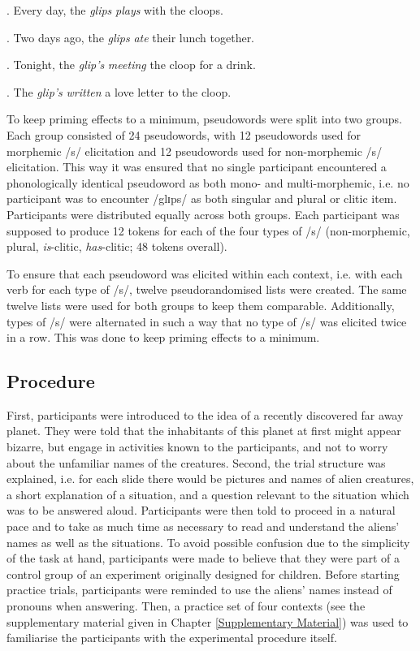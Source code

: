 \ex.
\label{ex:4.1}
Every day, the \textit{glips} \textit{plays} with the cloops.

\ex.
\label{ex:4.2}
Two days ago, the \textit{glips} \textit{ate} their lunch together.

\ex.
\label{ex:4.3}
Tonight, the \textit{glip's} \textit{meeting} the cloop for a drink.

\ex.
\label{ex:4.4}
The \textit{glip's} \textit{written} a love letter to the cloop.

To keep priming effects to a minimum, pseudowords were split into two groups. Each group consisted of 24 pseudowords, with 12 pseudowords used for morphemic /s/ elicitation and 12 pseudowords used for non-morphemic /s/ elicitation. This way it was ensured that no single participant encountered a phonologically identical pseudoword as both mono- and multi-morphemic, i.e. no participant was to encounter /glɪps/ as both singular and plural or clitic item. Participants were distributed equally across both groups. Each participant was supposed to produce 12 tokens for each of the four types of /s/ (non-morphemic, plural, \textit{is}-clitic, \textit{has}-clitic; 48 tokens overall).

To ensure that each pseudoword was elicited within each context, i.e. with each verb for each type of /s/, twelve pseudorandomised lists were created. The same twelve lists were used for both groups to keep them comparable. Additionally, types of /s/ were alternated in such a way that no type of /s/ was elicited twice in a row. This was done to keep priming effects to a minimum.

\subsection{Procedure}\label{section04_1_3}

First, participants were introduced to the idea of a recently discovered far away planet. They were told that the inhabitants of this planet at first might appear bizarre, but engage in activities known to the participants, and not to worry about the unfamiliar names of the creatures. Second, the trial structure was explained, i.e. for each slide there would be pictures and names of alien creatures, a short explanation of a situation, and a question relevant to the situation which was to be answered aloud. Participants were then told to proceed in a natural pace and to take as much time as necessary to read and understand the aliens’ names as well as the situations. To avoid possible confusion due to the simplicity of the task at hand, participants were made to believe that they were part of a control group of an experiment originally designed for children. Before starting practice trials, participants were reminded to use the aliens’ names instead of pronouns when answering. Then, a practice set of four contexts (see the supplementary material given in Chapter \ref{Supplementary Material}) was used to familiarise the participants with the experimental procedure itself.


